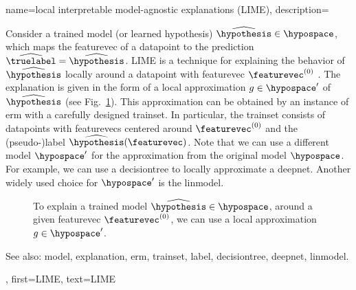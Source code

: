 {name={local interpretable model-agnostic explanations (LIME)},
	description={Consider 
		a trained \gls{model} (or learned \gls{hypothesis}) $\widehat{\hypothesis} \in \hypospace$, 
		which maps the \gls{featurevec} of a \gls{datapoint} to the \gls{prediction} $\widehat{\truelabel}= \widehat{\hypothesis}$. 
		LIME is a technique for explaining the behavior of $\widehat{\hypothesis}$ 
		locally around a \gls{datapoint} with \gls{featurevec} $\featurevec^{(0)}$ \cite{Ribeiro2016}. 
		The \gls{explanation} is given in the form of a local approximation $g \in \hypospace'$ of $\widehat{\hypothesis}$ 
		(see Fig.\ \ref{fig_lime_dict}). This approximation can be obtained by an instance of \gls{erm} 
		with a carefully designed \gls{trainset}. In particular, the \gls{trainset} consists of \glspl{datapoint} with 
		\glspl{featurevec} centered around $\featurevec^{(0)}$ and the (pseudo-)\gls{label} $\widehat{\hypothesis}(\featurevec)$. 
		Note that we can use a different \gls{model} $\hypospace'$ for the approximation from 
		the original \gls{model} $\hypospace$. For example, we can use a \gls{decisiontree} 
		to locally approximate a \gls{deepnet}. Another widely used choice for $\hypospace'$ is 
		the \gls{linmodel}. 
		\begin{figure}[H]
		\begin{center}
		\end{center}
		\caption{To explain a trained \gls{model} $\widehat{\hypothesis} \in \hypospace$, around a 
			given \gls{featurevec} $\featurevec^{(0)}$, we can use a local approximation $g \in \hypospace'$. }
			\label{fig_lime_dict}
		\end{figure}
		See also: \gls{model}, \gls{explanation}, \gls{erm}, \gls{trainset}, \gls{label}, \gls{decisiontree}, \gls{deepnet}, \gls{linmodel}.},
	first={LIME},
	text={LIME}
}

